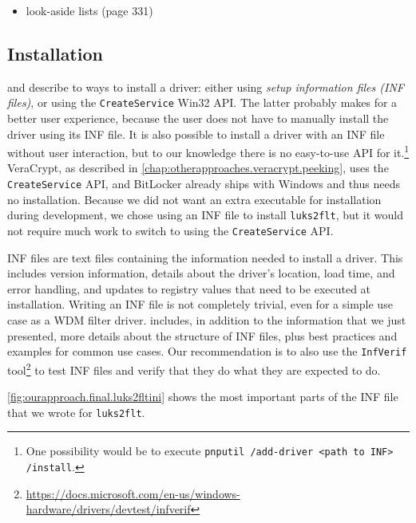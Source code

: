 \begin{itemize}
	\item look-aside lists (page 331)
\end{itemize}

\subsection{Installation}
\label{chap:ourapproach.final.install}
\cite{Yosifovich2017} and \cite{Wdk} describe to ways to install a driver: either using \emph{setup information files (INF files)}, or using the \texttt{CreateService} Win32 API. The latter probably makes for a better user experience, because the user does not have to manually install the driver using its INF file. It is also possible to install a driver with an INF file without user interaction, but to our knowledge there is no easy-to-use API for it.\footnote{\label{fn:ourapproach.final.automaticinfinstall} One possibility would be to execute \texttt{pnputil /add-driver <path to INF> /install}.} VeraCrypt, as described in \autoref{chap:otherapproaches.veracrypt.peeking}, uses the \texttt{CreateService} API, and BitLocker already ships with Windows and thus needs no installation. Because we did not want an extra executable for installation during development, we chose using an INF file to install \texttt{luks2flt}, but it would not require much work to switch to using the \texttt{CreateService} API.

INF files are text files containing the information needed to install a driver. This includes version information, details about the driver's location, load time, and error handling, and updates to registry values that need to be executed at installation. Writing an INF file is not completely trivial, even for a simple use case as a WDM filter driver. \cite{Wdk} includes, in addition to the information that we just presented, more details about the structure of INF files, plus best practices and examples for common use cases. Our recommendation is to also use the \texttt{InfVerif} tool\footnote{\label{fn:ourapproach.final.infverif} \url{https://docs.microsoft.com/en-us/windows-hardware/drivers/devtest/infverif}} to test INF files and verify that they do what they are expected to do.

\autoref{fig:ourapproach.final.luks2fltini} shows the most important parts of the INF file that we wrote for \texttt{luks2flt}.

